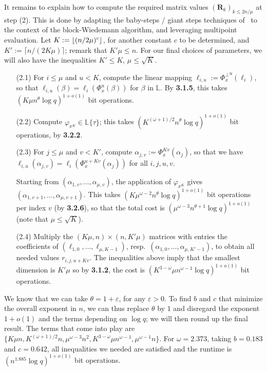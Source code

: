 \documentclass[sigconf]{acmart}
\renewcommand{\L}{\mathbb{L}}
\newcommand{\ang}[1]{\{#1\}}
\DeclarePairedDelimiter\floor{\lfloor}{\rfloor}
\begin{document}
It remains to explain how to compute the required matrix values $({\bm
  R}_k)_{k \le 2n/\mu}$ at step (2). This is done by adapting the
baby-steps / giant steps techniques of~\cite[Algorithm {\bf
    AP}]{KaSh98} to the context of the block-Wiedemann algorithm, and
leveraging multipoint evaluation.  Let $K:=\floor*{ (n/2\mu)^{c}}$,
for another constant $c$ to be determined, and $K':=\lceil n/(2K\mu )
\rceil$; remark that $K' \mu\le n$.  For our final choices of
parameters, we will also have the inequalities $K' \le K$, $\mu \le
\sqrt{K}$.
\begin{enumerate}
\item[(2.1)] For $i \le \mu$ and $u < K$, compute the linear mapping
  $\ell_{i,u}:= {\Phi_x^\perp}^u(\ell_i)$, so that $\ell_{i,u}(\beta)
  = \ell_i( \Phi_x^u(\beta) )$ for $\beta$ in $\L$. By {\bf 3.1.5},
  this takes $ (K \mu n^{\theta} \log q)^{1+o(1)}$ bit
  operations.

\item[(2.2)] Compute $\varphi_{x^K} \in \L\ang{\tau}$; 
  this takes $(K^{(\omega+1)/2}n^\theta \log q)^{1+o(1)}$ bit
  operations, by {\bf 3.2.2}.

\item[(2.3)] For $j \le \mu$ and $v < K'$, compute $\alpha_{j,v} :=
  \Phi_x^{Kv}(\alpha_j)$, so that we have
  $\ell_{i,u}(\alpha_{j,v}) = \ell_i( \Phi_x^{u+Kv}(\alpha_j) )$ for
  all $i,j,u,v$.

Starting from $(\alpha_{1,v},\dots,\alpha_{\mu,v})$, the application
of $\varphi_{x^K}$ gives
$(\alpha_{1,v+1},\dots,\alpha_{\mu,v+1})$. This takes $ (K
\mu^{\omega-2} n^{\theta} \log q)^{1+o(1)}$ bit operations per index
$v$ (by {\bf 3.2.6}), so that the total cost is $(\mu^{\omega-3} n^{\theta+1}
\log q)^{1+o(1)}$ (note that $\mu \le \sqrt{K}$).

\item[(2.4)] Multiply the $(K\mu,n) \times (n,K'\mu)$ matrices with
  entries the coefficients of $(\ell_{1,0},\dots,\ell_{\mu,K-1})$,
  resp.\, $(\alpha_{1,0},\dots,\alpha_{\mu,K'-1})$, to obtain all
  needed values $r_{i,j,u+Kv}$.  The inequalities above imply that the
  smallest dimension is $K'\mu$ so by {\bf 3.1.2}, the cost is $(K^{3-\omega}\mu n^{\omega-1} \log q)^{1 + o(1)}$ bit operations.
\end{enumerate}
We know that we can take $\theta=1+\varepsilon$, for any $\varepsilon
> 0$. To find $b$ and $c$ that minimize the overall exponent in $n$, we can
thus replace $\theta$ by $1$ and disregard the exponent $1+o(1)$ and
the terms depending on $\log q$; we will then round up the final
result.  The terms that come into play are $\{K\mu n,
K^{(\omega+1)/2}n, \mu^{\omega-3} n^2,  K^{3-\omega}\mu n^{\omega-1},
\mu^{\omega-1} n\}$.  For $\omega = 2.373$, taking $b = 0.183$ and
$c=0.642$, all inequalities we needed are satisfied and the runtime is
$(n^{1.885} \log q)^{1 + o(1)}$ bit operations. 
\end{document}

